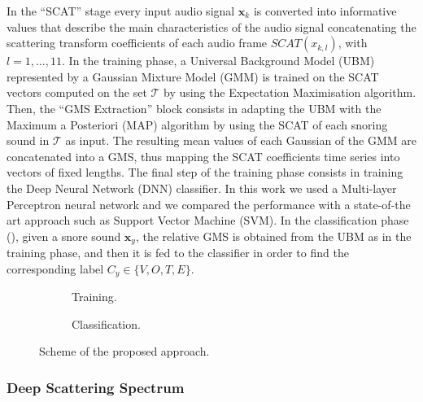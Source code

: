In the ``SCAT'' stage every input audio signal $\mathbf{x}_{k}$ is converted into informative values that describe the main characteristics of the audio signal concatenating the scattering transform coefficients of each audio frame $SCAT({x}_{k,l})$, with $l=1,\dots,11$.
In the training phase, a Universal Background Model (UBM) represented by a Gaussian Mixture Model (GMM) is trained on the SCAT vectors computed on the set $\mathcal{T}$ by using the Expectation Maximisation algorithm. Then, the ``GMS Extraction'' block consists in adapting the UBM with the Maximum a Posteriori (MAP) algorithm  by using the SCAT of each snoring sound in $\mathcal{T}$ as input. The resulting mean values of each Gaussian of the GMM are concatenated into a GMS, thus mapping the SCAT coefficients time series into vectors of fixed lengths. %
The final step of the training phase consists in training the Deep Neural Network (DNN) classifier. In this work we used a Multi-layer Perceptron neural network and we compared the performance with a state-of-the art approach such as Support Vector Machine (SVM).
In the classification phase (), given a snore sound $\mathbf{x}_y$, the relative GMS is obtained from the UBM as in the training phase, and then it is fed to the classifier in order to find the corresponding label $C_y \in \{V, O, T, E\}$.



\begin{figure}[h]
	\centering
	\begin{subfigure}[b]{0.3\columnwidth}
		\def\svgwidth{\columnwidth}
		
		\caption{Training.} \label{sfig:training}
	\end{subfigure}
	\begin{subfigure}[b]{0.3\columnwidth}
		\def\svgwidth{\columnwidth}
		
		\caption{Classification.} \label{sfig:testing}
	\end{subfigure}
	\caption{Scheme of the proposed approach.}\label{fig:scheme}
\end{figure}


\subsubsection{Deep Scattering Spectrum}

